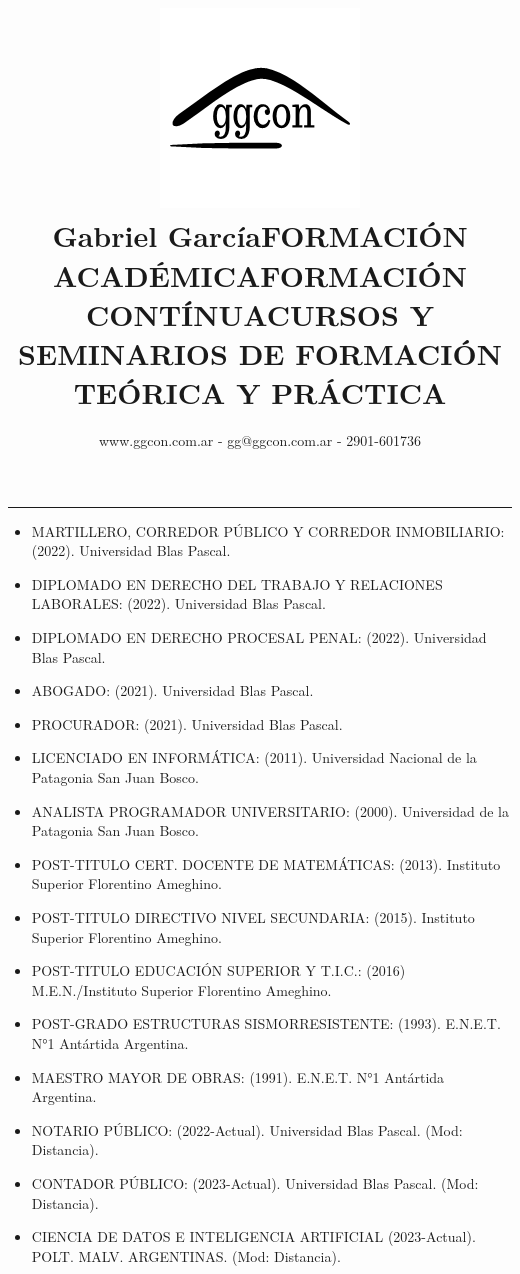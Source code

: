 \documentclass[a4paper,oneside,11pt]{article}
\title{ \includegraphics[scale=0.33]{img/logo ggcon.png} \\ \bf Gabriel García}
\author{www.ggcon.com.ar - gg@ggcon.com.ar - 2901-601736}
\date{}
\begin{document}
\maketitle  
\hrule

\begin{center}
    \title{FORMACIÓN ACADÉMICA}   
\end{center}

\begin{itemize}
    \item MARTILLERO, CORREDOR PÚBLICO Y CORREDOR INMOBILIARIO: (2022). Universidad Blas Pascal.
    \item DIPLOMADO EN DERECHO DEL TRABAJO Y RELACIONES LABORALES: (2022). Universidad Blas Pascal.
    \item DIPLOMADO EN DERECHO PROCESAL PENAL: (2022). Universidad Blas Pascal.
    \item ABOGADO: (2021). Universidad Blas Pascal.
    \item PROCURADOR: (2021). Universidad Blas Pascal.
    \item LICENCIADO EN INFORMÁTICA: (2011). Universidad Nacional de la Patagonia San Juan Bosco.
    \item ANALISTA PROGRAMADOR UNIVERSITARIO: (2000). Universidad de la Patagonia San Juan Bosco.
    \item POST-TITULO CERT. DOCENTE DE MATEMÁTICAS: (2013). Instituto Superior Florentino Ameghino.
    \item POST-TITULO DIRECTIVO NIVEL SECUNDARIA: (2015). Instituto Superior Florentino Ameghino.
    \item POST-TITULO EDUCACIÓN SUPERIOR Y T.I.C.: (2016) M.E.N./Instituto Superior Florentino Ameghino.
    \item POST-GRADO ESTRUCTURAS SISMORRESISTENTE: (1993). E.N.E.T. N°1 Antártida Argentina.
    \item MAESTRO MAYOR DE OBRAS: (1991). E.N.E.T. N°1 Antártida Argentina.
\end{itemize}
\begin{center}
    \title{FORMACIÓN CONTÍNUA}   
\end{center}

\begin{itemize}
    \item NOTARIO PÚBLICO: (2022-Actual). Universidad Blas Pascal. (Mod: Distancia).
    \item CONTADOR PÚBLICO: (2023-Actual). Universidad Blas Pascal. (Mod: Distancia).
    \item CIENCIA DE DATOS E INTELIGENCIA ARTIFICIAL (2023-Actual). POLT. MALV. ARGENTINAS. (Mod: Distancia).
\end{itemize}
\begin{center}
    \title{CURSOS Y SEMINARIOS DE FORMACIÓN TEÓRICA Y PRÁCTICA}   
\end{center}
\end{document}
